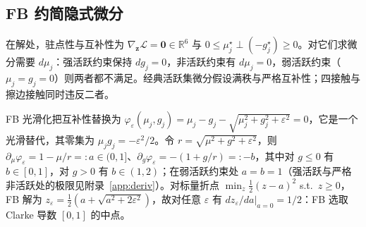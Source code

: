 \subsection{FB 约简隐式微分}\label{sec:fb}
在解处，驻点性与互补性为 $\nabla_{\mathbf z}\mathcal L=\mathbf 0\in\mathbb{R}^6$ 与 $0\le\mu_j^\star\perp(-g_j^\star)\ge0$。对它们求微分需要 $d\mu_j$：强活跃约束保持 $dg_j=0$，非活跃约束有 $d\mu_j=0$，弱活跃约束（$\mu_j=g_j=0$）则两者都不满足。经典活跃集微分假设满秩与严格互补性；四接触与擦边接触同时违反二者。

FB 光滑化把互补性替换为 $\varphi_\varepsilon(\mu_j,g_j)=\mu_j-g_j-\sqrt{\mu_j^2+g_j^2+\varepsilon^2}=0$，它是一个光滑替代，其零集为 $\mu_jg_j=-\varepsilon^2/2$。令 $r=\sqrt{\mu^2+g^2+\varepsilon^2}$，则 $\partial_\mu\varphi_\varepsilon=1-\mu/r=:a\in(0,1]$、$\partial_g\varphi_\varepsilon=-(1+g/r)=:-b$，其中对 $g\le0$ 有 $b\in[0,1]$，对 $g>0$ 有 $b\in(1,2)$；在弱活跃约束处 $a=b=1$（强活跃与严格非活跃处的极限见附录~\ref{app:deriv}）。对标量折点 $\min_z\tfrac12(z-a)^2$ s.t.\ $z\ge0$，FB 解为 $z_\varepsilon=\tfrac12(a+\sqrt{a^2+2\varepsilon^2})$，故对任意 $\varepsilon$ 有 $dz_\varepsilon/da|_{a=0}=1/2$：FB 选取 Clarke 导数 $[0,1]$ 的中点。


